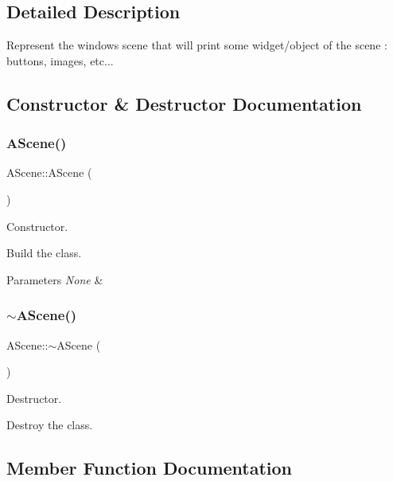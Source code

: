 \subsection{Detailed Description}
Represent the window\textquotesingle{}s scene that will print some widget/object of the scene \+: buttons, images, etc... 

\subsection{Constructor \& Destructor Documentation}
\mbox{\label{classAScene_ad0eacf691dbc8240fdf3a42d450c1042}} 
\subsubsection{\texorpdfstring{A\+Scene()}{AScene()}}
{\footnotesize\ttfamily A\+Scene\+::\+A\+Scene (\begin{DoxyParamCaption}{ }\end{DoxyParamCaption})}



Constructor. 

Build the class.


\begin{DoxyParams}{Parameters}
{\em None} & \\
\hline
\end{DoxyParams}
\mbox{\label{classAScene_a9faf7f1a271327227e83627432d0b210}} 
\subsubsection{\texorpdfstring{$\sim$\+A\+Scene()}{~AScene()}}
{\footnotesize\ttfamily A\+Scene\+::$\sim$\+A\+Scene (\begin{DoxyParamCaption}{ }\end{DoxyParamCaption})}



Destructor. 

Destroy the class. 

\subsection{Member Function Documentation}
\mbox{\label{classAScene_aa711b6068dd8dee262160eedfd96ad02}} 
